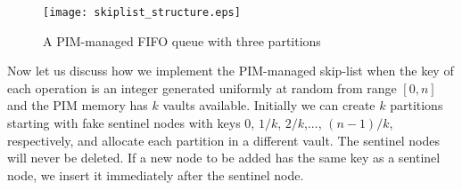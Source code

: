 \begin{figure}[ht!]
\centering
\texttt{[image: skiplist\_structure.eps]}
\caption{A PIM-managed FIFO queue with three partitions}
\label{figure:skiplist_structure}
\end{figure}

Now let us discuss how we implement the PIM-managed skip-list
when the key of each operation is an integer generated uniformly at random
from range $[0, n]$ and the PIM memory has $k$ vaults available.
Initially we can create $k$ partitions starting with fake sentinel nodes
with keys $0$, $1/k$, $2/k$,..., $(n-1)/k$, respectively, 
and allocate each partition in a different vault. 
The sentinel nodes will never be deleted.
If a new node to be added has the same key as a sentinel node,
we insert it immediately after the sentinel node.

